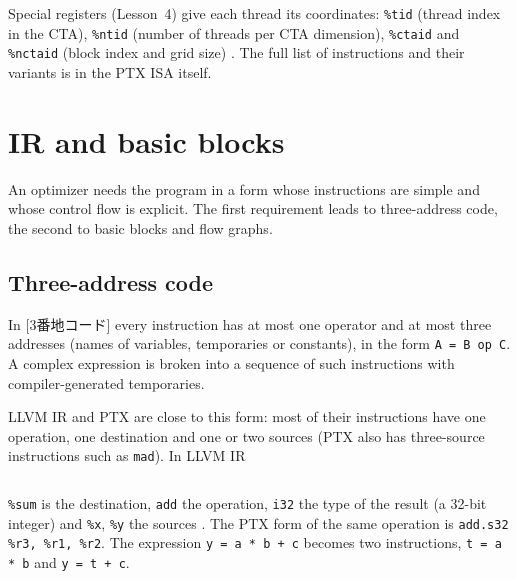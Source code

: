 \documentclass[../main.tex]{subfiles}
\begin{document}
Special registers (Lesson~4) give each thread its coordinates:
\texttt{\%tid} (thread index in the CTA), \texttt{\%ntid} (number of
threads per CTA dimension), \texttt{\%ctaid} and \texttt{\%nctaid}
(block index and grid size) \cite[§10]{nvidia2026ptx}.  The full list of instructions and
their variants is in the PTX ISA itself.

\section{IR and basic blocks}
\label{sec:l10-ir}

An optimizer needs the program in a form whose instructions are simple
and whose control flow is explicit.  The first requirement
leads to three-address code, the second to basic blocks and flow
graphs.

\subsection{Three-address code}

\begin{definition}
  In [3番地コード] every instruction has at
  most one operator and at most three addresses (names of variables,
  temporaries or constants), in the form \texttt{A = B op C}.  A
  complex expression is broken into a sequence of such instructions with
  compiler-generated temporaries.
\end{definition}

LLVM IR and PTX are close to this form: most of their instructions
have one operation, one destination and one or two sources (PTX also
has three-source instructions such as \texttt{mad}).  In LLVM IR
\begin{lstlisting}[language=C++, numbers=none]
%sum = add i32 %x, %y
\end{lstlisting}
\texttt{\%sum} is the destination, \texttt{add} the operation,
\texttt{i32} the type of the result (a 32-bit integer) and
\texttt{\%x}, \texttt{\%y} the sources
\cite{llvm2026langref}.  The PTX form of the same operation is
\texttt{add.s32 \%r3, \%r1, \%r2}.  The expression
\texttt{y = a * b + c} becomes two instructions, \texttt{t = a * b}
and \texttt{y = t + c}.
\end{document}
